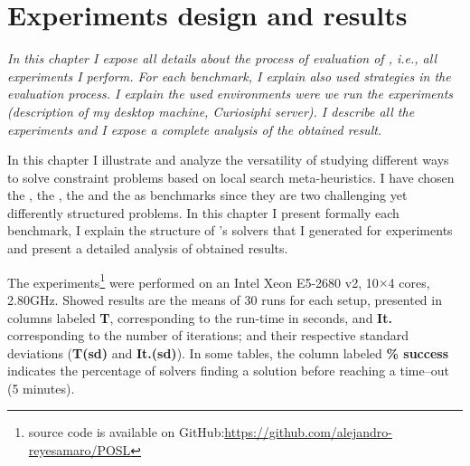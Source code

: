 \chapter{Experiments design and results}
\label{chap:expe}
\textit{In this chapter I expose all details about the process of evaluation of \posl{}, i.e., all experiments I perform. For each benchmark, I explain also used strategies in the evaluation process.
I explain the used environments were we run the experiments (description of my desktop machine, \textit{Curiosiphi} server). %
I describe all the experiments and I expose a complete analysis of the obtained result.}
\vfill
\minitoc
\newpage

In this chapter I illustrate and analyze the versatility of \posl{} studying different ways to solve constraint problems based on local search meta-heuristics. 
I have chosen the \sgp, the \nqp, the \carrp{} and the \grp{} as benchmarks since they are two challenging yet differently structured problems. In this chapter I present formally each benchmark, I explain the structure of \posl's solvers that I generated for experiments and present a detailed analysis of obtained results.

The experiments\footnote{\posl{} source code is available on GitHub:\href{https://github.com/alejandro-reyesamaro/POSL}{https://github.com/alejandro-reyesamaro/POSL}} 
were performed on an Intel\R{} Xeon\TM{} E5-2680 v2, 10$\times$4 cores, 2.80GHz. Showed results are the means of 30 runs for each setup, presented in columns labeled {\bf T}, corresponding to the run-time in seconds, and {\bf It.} corresponding to the number of iterations; and their respective standard deviations ({\bf T(sd)} and {\bf It.(sd)}). In some tables, the column labeled \textbf{\% success} indicates the percentage of solvers finding a solution before reaching a time--out (5 minutes).




